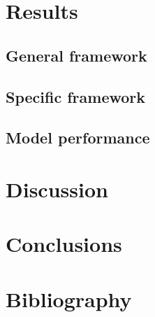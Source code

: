 \documentclass{article}
\begin{document}
\section*{Results}\label{results}
\subsection*{General framework}\label{results:genframework}
\subsection*{Specific framework}\label{results:specframework}

\subsection*{Model performance}\label{results:modperformance}

\section*{Discussion}\label{discussion}

\section*{Conclusions}\label{conclusions}

\section*{Bibliography}
\end{document}
